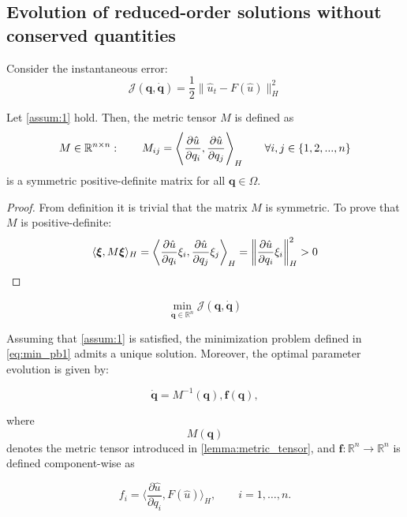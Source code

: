 \subsection{Evolution of reduced-order solutions without conserved quantities}

Consider the instantaneous error:
\begin{equation}
    \label{eq:J1}
    \mathcal{J} (\mathbf{q}, \dot{\mathbf{q}}) = \frac{1}{2} \|\hat{u}_t - F(\hat{u})\|^2_H
\end{equation} 

\begin{lemma}
    \label{lemma:metric_tensor}
    Let \autoref{assum:1} hold. Then, the metric tensor $M$ is defined as
    \begin{equation}
        M \in \mathbb{R}^{n\times n} :\hspace{20pt} M_{ij} = \Biggl \langle\frac{\partial \hat{u}}{\partial q_i}, \frac{\partial \hat{u}}{\partial q_j} \Biggr \rangle _H
        \hspace{20pt} \forall i,j \in \{1, 2, ... , n\}
    \end{equation}
    is a symmetric positive-definite matrix for all $\mathbf{q}\in\Omega$.
\end{lemma}

\begin{proof}
    From definition it is trivial that the matrix $M$ is symmetric. 
    To prove that $M$ is positive-definite:
    \begin{equation}
        \langle \boldsymbol{\xi}, M \boldsymbol{\xi} \rangle_H = 
        \biggl \langle \frac{\partial \hat{u}}{\partial q_i}\xi_{i},\frac{\partial \hat{u}}{\partial q_j}\xi_{j} \biggr \rangle_H = 
        \biggl \| \frac{\partial \hat{u}}{\partial q_i}\xi_{i} \biggr \|_H^2   > 0 
    \end{equation}
\end{proof}

\begin{equation}
    \min_{\dot{\mathbf q} \in \mathbb{R}^n} \mathcal{J}(\mathbf q, \dot{\mathbf q})
    \label{eq:min_pb1}
\end{equation}

\begin{theorem}
    Assuming that \autoref{assum:1} is satisfied, the minimization problem defined in \eqref{eq:min_pb1} admits a unique solution. 
    Moreover, the optimal parameter evolution is given by:
    
    \begin{equation}
        \dot{\mathbf q}=M^{-1}(\mathbf q),\mathbf f(\mathbf q),
        \label{eq:parameter_evolution}
    \end{equation}
    
    where $$M(\mathbf q)$$ denotes the metric tensor introduced in \autoref{lemma:metric_tensor}, and $\mathbf f:\mathbb R^n\rightarrow\mathbb R^n$ is defined component-wise as
    
    \begin{equation}
        f_i = \biggl \langle 
        \frac{\partial \hat u}{\partial q_i},
        F(\hat u)
        \biggl \rangle _H,
        \qquad i=1,\ldots,n.
    \end{equation}
    
\end{theorem}
    
